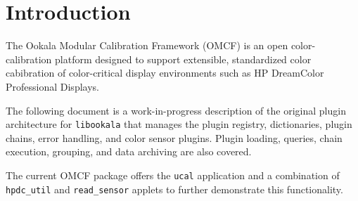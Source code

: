 
\section{Introduction}

The Ookala Modular Calibration Framework (OMCF) is an open
color-calibration platform designed to support extensible,
standardized color cabibration of color-critical display
environments such as HP DreamColor Professional Displays.

The following document is a work-in-progress description
of the original plugin architecture for {\tt libookala}
that manages the plugin registry, dictionaries, plugin
chains, error handling, and color sensor plugins.
Plugin loading, queries, chain execution, grouping, and
data archiving are also covered.

The current OMCF package offers the {\tt ucal} application
and a combination of {\tt hpdc\_util} and {\tt read\_sensor} 
applets to further demonstrate this functionality.




